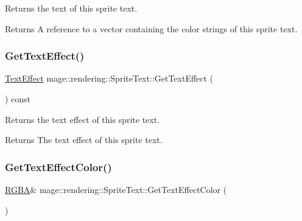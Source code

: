 Returns the text of this sprite text.

\begin{DoxyReturn}{Returns}
A reference to a vector containing the color strings of this sprite text. 
\end{DoxyReturn}
\mbox{\label{classmage_1_1rendering_1_1_sprite_text_a7c61e9d50bb6c3c46507706e1aad8d5c}} 
\subsubsection{\texorpdfstring{Get\+Text\+Effect()}{GetTextEffect()}}
{\footnotesize\ttfamily \mbox{\hyperlink{classmage_1_1rendering_1_1_sprite_text_af07ecf28d2ab8997c011cab74e799ef7}{Text\+Effect}} mage\+::rendering\+::\+Sprite\+Text\+::\+Get\+Text\+Effect (\begin{DoxyParamCaption}{ }\end{DoxyParamCaption}) const\hspace{0.3cm}{\ttfamily [noexcept]}}

Returns the text effect of this sprite text.

\begin{DoxyReturn}{Returns}
The text effect of this sprite text. 
\end{DoxyReturn}
\mbox{\label{classmage_1_1rendering_1_1_sprite_text_aa5cd1f28efdf8508474dd962e8733783}} 
\subsubsection{\texorpdfstring{Get\+Text\+Effect\+Color()}{GetTextEffectColor()}\hspace{0.1cm}{\footnotesize\ttfamily [1/2]}}
{\footnotesize\ttfamily \mbox{\hyperlink{structmage_1_1_r_g_b_a}{R\+G\+BA}}\& mage\+::rendering\+::\+Sprite\+Text\+::\+Get\+Text\+Effect\+Color (\begin{DoxyParamCaption}{ }\end{DoxyParamCaption})\hspace{0.3cm}{\ttfamily [noexcept]}}

